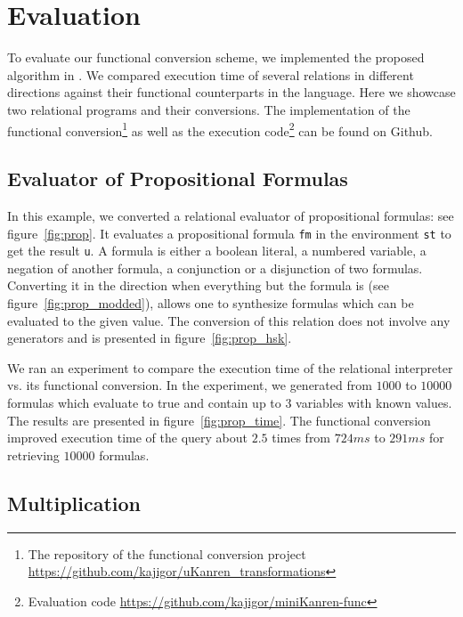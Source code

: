 \section{Evaluation}

To evaluate our functional conversion scheme, we implemented the proposed algorithm in \haskell.
We compared execution time of several \ocanren relations in different directions against their functional counterparts in the \ocaml language.
Here we showcase two relational programs and their conversions.
The implementation of the functional conversion\footnote{The repository of the functional conversion project \url{https://github.com/kajigor/uKanren_transformations}} as well as the execution code\footnote{Evaluation code \url{https://github.com/kajigor/miniKanren-func}} can be found on Github.



\subsection{Evaluator of Propositional Formulas}

In this example, we converted a relational evaluator of propositional formulas: see figure~\ref{fig:prop}.
It evaluates a propositional formula \lstinline{fm} in the environment \lstinline{st} to get the result \lstinline{u}.
A formula is either a boolean literal, a numbered variable, a negation of another formula, a conjunction or a disjunction of two formulas.
Converting it in the direction when everything but the formula is \inm (see figure~\ref{fig:prop_modded}), allows one to synthesize formulas which can be evaluated to the given value.
The conversion of this relation does not involve any generators and is presented in figure~\ref{fig:prop_hsk}.

We ran an experiment to compare the execution time of the relational interpreter vs. its functional conversion.
In the experiment, we generated from $1000$ to $10000$ formulas which evaluate to true and contain up to $3$ variables with known values.
The results are presented in figure~\ref{fig:prop_time}.
The functional conversion improved execution time of the query about $2.5$ times from $724ms$ to $291ms$ for retrieving $10000$ formulas.





\subsection{Multiplication}

